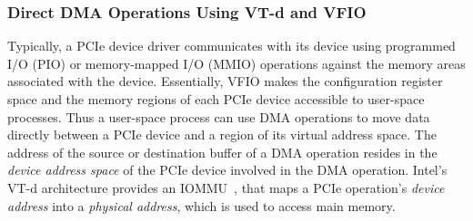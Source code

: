 \subsubsection{Direct DMA Operations Using VT-d and VFIO} 
Typically, a PCIe device driver communicates with its device using programmed I/O (PIO) or
memory-mapped I/O (MMIO) operations against the memory areas associated with the device. 
Essentially, VFIO makes the configuration register space and the memory regions of
each PCIe device accessible to user-space processes.
%
%
%
Thus a user-space process can use DMA operations to move data directly between a PCIe device and 
a region of its virtual address space.
The address of the source or destination buffer of a DMA operation resides in 
the {\em device address space} of the PCIe device involved in the DMA operation.
Intel's VT-d architecture provides an IOMMU~\cite{ben:2006}, that maps a 
PCIe operation's {\em device address} into a {\em physical address}, 
which is used to access main memory. 
  
